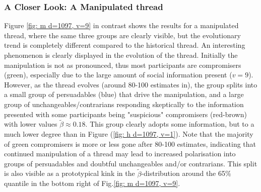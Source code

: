 \documentclass[9pt,twocolumn,twoside,lineno]{pnas-new}
\begin{document}


\subsubsection*{A Closer Look: A Manipulated thread}
Figure \ref{fig: m d=1097, v=9} in contrast shows the results for a manipulated thread, where the same three groups are clearly visible, but the evolutionary trend is completely different compared to the historical thread. An interesting phenomenon is clearly displayed in the evolution of the thread. Initially the manipulation is not as pronounced, thus most participants are compromisers (green), especially due to the large amount of social information present ($v=9$). However, as the thread evolves (around 80-100 estimates in), the group splits into a small group of persuadables (blue) that drive the manipulation, and a large group of unchangeables/contrarians responding skeptically to the information presented with some participants being "suspicious" compromisers (red-brown) with lower values $\tilde{\beta}\approx 0.18$. This group clearly adopts some information, but to a much lower degree than in Figure (\ref{fig: h d=1097, v=1}). Note that the majority of green compromisers is more or less gone after 80-100 estimates, indicating that continued manipulation of a thread may lead to increased polarisation into groups of persuadables and doubtful unchangeables and/or contrarians. This split is also visible as a prototypical kink in the $\tilde{\beta}$-distribution around the 65\% quantile in the bottom right of Fig.\ref{fig: m d=1097, v=9}.
\end{document}
